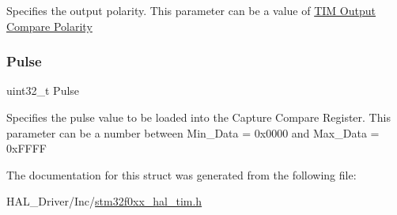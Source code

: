 Specifies the output polarity. This parameter can be a value of \hyperlink{group___t_i_m___output___compare___polarity}{T\+IM Output Compare Polarity} \mbox{\label{struct_t_i_m___one_pulse___init_type_def_a5251c3bce4ca5baf013bc0ace0865a4c}} 
\subsubsection{\texorpdfstring{Pulse}{Pulse}}
{\footnotesize\ttfamily uint32\+\_\+t Pulse}

Specifies the pulse value to be loaded into the Capture Compare Register. This parameter can be a number between Min\+\_\+\+Data = 0x0000 and Max\+\_\+\+Data = 0x\+F\+F\+FF 

The documentation for this struct was generated from the following file\+:\begin{DoxyCompactItemize}
\item 
H\+A\+L\+\_\+\+Driver/\+Inc/\hyperlink{stm32f0xx__hal__tim_8h}{stm32f0xx\+\_\+hal\+\_\+tim.\+h}\end{DoxyCompactItemize}
